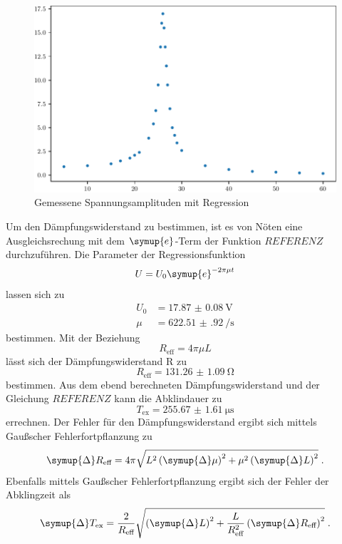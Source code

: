 \begin{figure}
    \centering
    \caption{Gemessene Spannungsamplituden mit Regression}
    \label{fig:voltage}
    \includegraphics{build/voltage.pdf}
\end{figure}
Um den Dämpfungswiderstand zu bestimmen, ist es von Nöten eine Ausgleichsrechung mit dem $\symup{e}$-Term der Funktion
$REFERENZ$ durchzuführen.
Die Parameter der Regressionsfunktion
\begin{equation}
    U = U_0 \symup{e}^{-2\pi\mu t}
\end{equation}
lassen sich zu
\begin{align*}
    U_0 &= \SI{17.87(8)}{\volt}\\
    \mu &= \SI{622.51(92)}{\per\second}
\end{align*}
bestimmen.
Mit der Beziehung 
\begin{equation}
    R_\text{eff} = 4\pi\mu L 
\end{equation}
lässt sich der Dämpfungswiderstand R zu
\begin{equation*}
    R_\text{eff} = \SI{131.26(109)}{\ohm}
\end{equation*}
bestimmen.
Aus dem ebend berechneten Dämpfungswiderstand und der Gleichung $REFERENZ$ kann die Abklindauer zu 
\begin{equation*}
    T_\text{ex} = \SI{255.67(161)}{\micro\second}
\end{equation*}
errechnen.
Der Fehler für den Dämpfungswiderstand ergibt sich mittels Gaußscher Fehlerfortpflanzung zu 
\begin{equation}
    \symup{\Delta} R_\text{eff} = 4\pi \sqrt{L^2 \left( \symup{\Delta} \mu \right)^2  + \mu^2 \left( \symup{\Delta} L \right)^2} \; \text{}.
\end{equation}
Ebenfalls mittels Gaußscher Fehlerfortpflanzung ergibt sich der Fehler der Abklingzeit als
\begin{equation}
    \symup{\Delta} T_\text{ex} = \frac{2}{R_\text{eff}} \sqrt{\left( \symup{\Delta} L \right)^2 + \frac{L}{R_\text{eff}^2} \left( \symup{\Delta} R_\text{eff}  \right)^2 } \; \text{.}
\end{equation}
